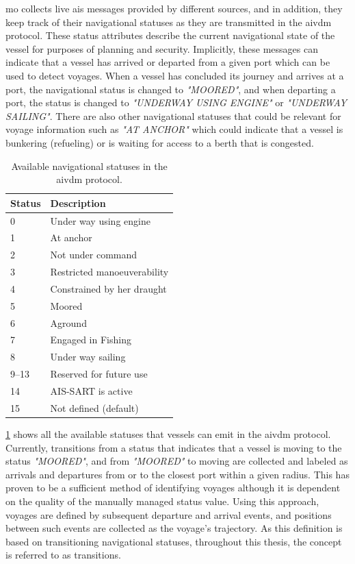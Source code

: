 \acrshort{mo} collects live \acrshort{ais} messages provided by different sources, and in addition, they keep track of their navigational statuses as they are transmitted in the \gls{aivdm} protocol. These status attributes describe the current navigational state of the vessel for purposes of planning and security. Implicitly, these messages can indicate that a vessel has arrived or departed from a given port which can be used to detect voyages. When a vessel has concluded its journey and arrives at a port, the navigational status is changed to \textit{"MOORED"}, and when departing a port, the status is changed to \textit{"UNDERWAY USING ENGINE"} or \textit{"UNDERWAY SAILING"}. There are also other navigational statuses that could be relevant for voyage information such as \textit{"AT ANCHOR"} which could indicate that a vessel is bunkering (refueling) or is waiting for access to a berth that is congested.

\begin{table}
    \centering
    \small{\begin{tabular}{l l}
    \toprule
        \textbf{Status} & \textbf{Description} \\ \midrule
        0 & Under way using engine \\ \midrule
        1 & At anchor \\ \midrule
        2 & Not under command \\ \midrule
        3 & Restricted manoeuverability \\ \midrule
        4 & Constrained by her draught \\ \midrule
        5 & Moored \\ \midrule
        6 & Aground \\ \midrule
        7 & Engaged in Fishing \\ \midrule
        8 & Under way sailing \\ \midrule
        9--13 & Reserved for future use \\ \midrule
        14 & AIS-SART is active \\ \midrule
        15 & Not defined (default) \\ \bottomrule
    \end{tabular}}
    \caption{Available navigational statuses in the \gls{aivdm} protocol.}\label{tab:nav_stats}
\end{table}

\cref{tab:nav_stats} shows all the available statuses that vessels can emit in the \gls{aivdm} protocol. Currently, transitions from a status that indicates that a vessel is moving to the status \textit{"MOORED"}, and from \textit{"MOORED"} to moving are collected and labeled as arrivals and departures from or to the closest port within a given radius. This has proven to be a sufficient method of identifying voyages although it is dependent on the quality of the manually managed status value. Using this approach, voyages are defined by subsequent departure and arrival events, and positions between such events are collected as the voyage's trajectory. As this definition is based on transitioning navigational statuses, throughout this thesis, the concept is referred to as \glspl{transition}.

